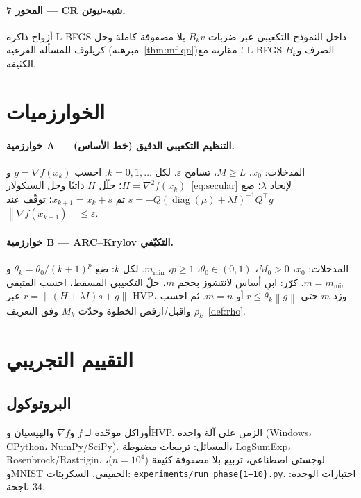 \documentclass[11pt,a4paper]{article}
\theoremstyle{plain}
\theoremstyle{definition}
\newcommand{\norm}[1]{\left\|#1\right\|}
\newcommand{\grad}{\nabla}
\newcommand{\hess}{\nabla^{2}}
\begin{document}
\paragraph{المحور 7 --- CR شبه-نيوتن.}
أزواج ذاكرة L-BFGS داخل النموذج التكعيبي عبر ضربات $B_{k}v$ بلا مصفوفة كاملة وحل كريلوف للمسألة الفرعية (مبرهنة~\ref{thm:mf-qn})؛ مقارنة مع L-BFGS الصرف و$B_{k}$ الكثيفة.

\section{الخوارزميات}
\label{sec:algo}

\paragraph{خوارزمية A --- التنظيم التكعيبي الدقيق (خط الأساس).}
المدخلات: $x_{0}$، $M\ge L$، تسامح $\varepsilon$.
لكل $k=0,1,\dots$: احسب $g=\grad f(x_{k})$ و$H=\hess f(x_{k})$؛ حلّل $H$ ذاتيًا وحل السيكولار~\eqref{eq:secular} لإيجاد $\lambda$؛ ضع
$s=-Q(\operatorname{diag}(\mu)+\lambda I)^{-1}Q^{\top}g$ ثم $x_{k+1}=x_{k}+s$؛ توقّف عند $\norm{\grad f(x_{k+1})}\le\varepsilon$.

\paragraph{خوارزمية B --- ARC--Krylov التكيّفي.}
المدخلات: $x_{0}$، $M_{0}>0$، $\theta_{0}\in(0,1)$، $p\ge 1$، $m_{\min}$.
لكل $k$: ضع $\theta_{k}=\theta_{0}/(k+1)^{p}$ و$m=m_{\min}$. كرّر: ابنِ أساس لانتشوز بحجم $m$، حلّ التكعيبي المسقط، احسب المتبقي $r=\norm{(H+\lambda I)s+g}$ عبر HVP، وزد $m$ حتى $r\le\theta_{k}\norm{g}$ أو $m=n$. ثم احسب $\rho_{k}$ واقبل/ارفض الخطوة وحدّث $M_{k}$ وفق التعريف~\ref{def:rho}.

\section{التقييم التجريبي}
\label{sec:exp}

\subsection{البروتوكول}
أوراكل موحّدة لـ $f$ و$\grad f$ والهيسيان وHVP.
الزمن على آلة واحدة (Windows، CPython، NumPy/SciPy).
المسائل: تربيعات مضبوطة، LogSumExp، Rosenbrock/Rastrigin، لوجستي اصطناعي، تربيع بلا مصفوفة كثيفة ($n=10^{4}$)، وMNIST الحقيقي.
السكربتات: \textenglish{\texttt{experiments/run\_phase\{1--10\}.py}}.
اختبارات الوحدة: $34$ ناجحة.
\end{document}
